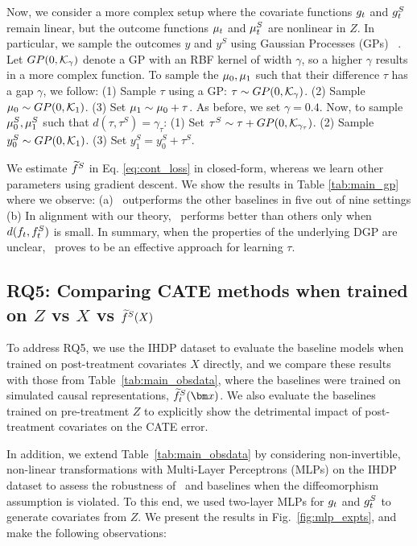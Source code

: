 Now, we consider a more complex setup where the covariate functions $\R_t$ and $\S_t$ remain linear, but the outcome functions $\realmu_t$ and $\synmu_t$ are nonlinear in $Z$. In particular, we sample the outcomes $y$ and $y^S$ using Gaussian Processes (GPs) ~\citep{gpml}. Let $GP(0, \cK_\gamma)$ denote a GP with an RBF kernel of width $\gamma$, so a higher $\gamma$ results in a more complex function. To sample the $\realmu_0, \realmu_1$ such that their difference $\tau$ has a gap $\gamma$, we follow:
(1) Sample $\tau$ using a GP: $\tau \sim GP(0, \cK_\gamma)$.
(2) Sample $\realmu_0 \sim GP(0, \cK_1)$.
(3) Set $\realmu_1 \sim \realmu_0 + \tau$.
As before, we set $\gamma=0.4$.
Now, to sample $\synmu_0, \synmu_1$ such that $d(\tau, \tau^S) = \gamma_\tau$:
(1) Set $\tau^S \sim \tau + GP(0, \cK_{\gamma_\tau})$.
(2) Sample $y^S_0 \sim GP(0, \cK_1)$.
(3) Set $y^S_1 = y^S_0 + \tau^S$.
% 


We estimate $\SInvCont$ in Eq. \ref{eq:cont_loss} in closed-form, whereas we learn other parameters using gradient descent.
We show the results in Table \ref{tab:main_gp} where we observe: (a) \our\ outperforms the other baselines in five out of nine settings (b)
In alignment with our theory, \muonly\ performs better than others only when $d(\RInv_t, \SInv_t)$ is small. In summary, when the properties of the underlying DGP are unclear, \our\ proves to be an effective approach for learning $\tau$.




\subsection{RQ5: Comparing CATE methods when trained on $Z$ vs $X$ vs $\SInvCont(X)$}
\label{app:mlp_expts}
To address RQ5, we use the IHDP dataset to evaluate the baseline models when trained on post-treatment covariates $X$ directly, and we compare these results with those from Table~\ref{tab:main_obsdata}, where the baselines were trained on simulated causal representations, $\SInvCont_t(\xb)$. We also evaluate the baselines trained on pre-treatment $Z$ to explicitly show the detrimental impact of post-treatment covariates on the CATE error.

In addition, we extend Table~\ref{tab:main_obsdata} by considering non-invertible, non-linear transformations with Multi-Layer Perceptrons (MLPs) on the IHDP dataset to assess the robustness of \our\ and baselines when the diffeomorphism assumption is violated. To this end, we used two-layer MLPs for $\R_t$ and $\S_t$ to generate covariates from $Z$. We present the results in Fig.~\ref{fig:mlp_expts}, and make the following observations:

